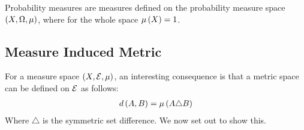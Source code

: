 \begin{example}
  Probability measures are measures
  defined on the probability measure space
  \(\left(X, \Omega, \mu\right)\),
  where for the whole space \(\mu\left(X\right) = 1\).
\end{example}



\subsection{Measure Induced Metric}

For a measure space \(\left(X, \mathcal{E}, \mu\right)\),
an interesting consequence is that a
metric space can be defined on \(\mathcal{E}\)
as follows:
\begin{align*}
  d\left(A, B\right) = \mu\left(A \triangle B\right)
\end{align*}
Where \(\triangle\) is the symmetric set difference.
We now set out to show this.


